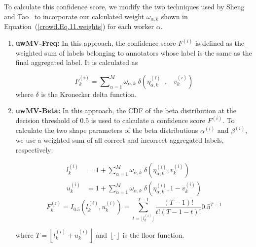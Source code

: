 \documentclass[pdflatex,bst/sn-basic]{bst/sn-jnl}%
\begin{document}
To calculate this confidence score, we modify the two techniques used by Sheng~\cite{sheng_Majority_2019} and Tao~\cite{tao_Label_2020} to incorporate our calculated weight $\omega_{\alpha,k} $ shown in Equation~(\ref{crowd.Eq.11.weights})  for each worker $\alpha $.

\begin{enumerate}[1.]
    \item \textbf{uwMV-Freq:} In this approach, the confidence score $F^{(i)} $ is defined as the weighted sum of labels belonging to annotators whose label is the same as the final aggregated label. It is calculated as

    \begin{equation}
        F_k^{(i)}={\sum\nolimits_{\alpha=1}^{M}{\omega_{\alpha,k}\;\delta\left(\eta_{\alpha,k}^{(i)}\;\;,\;\;\;v_k^{(i)}\right)}}
        \label{crowd.Eq.13.confidence-score.freq}
    \end{equation}
    where $\delta $ is the Kronecker delta function.


    \item \textbf{uwMV-Beta:} In this approach, the CDF of the beta distribution at the decision threshold of $0.5 $ is used to calculate a confidence score $F^{(i)} $. To calculate the two shape parameters of the beta distributions $\alpha^{(i)} $ and $\beta^{(i)} $, we use a weighted sum of all correct and incorrect aggregated labels, respectively:

    \begin{equation}
        \begin{aligned}
            l_k^{(i)} &= 1 + \sum_{\alpha=1}^{M} \omega_{\alpha,k} \; \delta\left(\eta_{\alpha,k}^{(i)}, v_{k}^{(i)}\right) \\
            u_k^{(i)} &= 1 + \sum_{\alpha=1}^{M} \omega_{\alpha,k} \; \delta\left(\eta_{\alpha,k}^{(i)}, 1 - v_{k}^{(i)}\right)
        \end{aligned}
        \label{crowd.Eq.14.beta_l_u}
    \end{equation}
    \begin{equation}
        F_k^{(i)}=I_{0.5}\left(l_k^{(i)},u_k^{(i)}\right)=\sum_{t=\lfloor l_k^{(i)}\rfloor}^{T-1}\frac{(T-1)!}{t!(T-1-t)!}0.5^{T-1}
        \label{crowd.Eq.15.confidence-score.beta}
    \end{equation}

    where $T=\left\lfloor l_k^{(i)} + u_k^{(i)}\right\rfloor $ and $\left\lfloor\cdot\right\rfloor $ is the floor function.

\end{enumerate}
\end{document}
